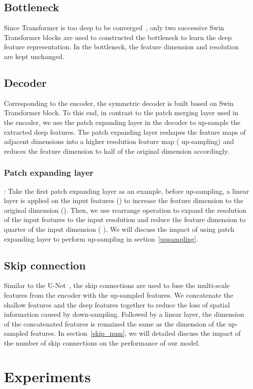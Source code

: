 \documentclass[runningheads]{llncs}
\begin{document}
\subsection{Bottleneck}
Since Transformer is too deep to be converged~\cite{deeper}, only two successive Swin Transformer blocks are used to constructed the bottleneck to learn the deep feature representation. In the bottleneck, the feature dimension and resolution are kept unchanged.

\subsection{Decoder}

Corresponding to the encoder, the symmetric decoder is built based on Swin Transformer block. To this end, in contrast to the patch merging layer used in the encoder, we use the patch expanding layer in the decoder to up-sample the extracted deep features. The patch expanding layer reshapes the feature maps of adjacent dimensions into a higher resolution feature map ( up-sampling) and reduces the feature dimension to half of the original dimension accordingly. 

\subsubsection{Patch expanding layer}:
Take the first patch expanding layer as an example, before up-sampling, a linear layer is applied on the input features () to increase the feature dimension to  the original dimension (). Then, we use rearrange operation to expand the resolution of the input features to  the input resolution and reduce the feature dimension to quarter of the input dimension (  ). We will discuss the impact of using patch expanding layer to perform up-sampling in section~\ref{upsampling}.

\subsection{Skip connection}
Similar to the U-Net~\cite{unet}, the skip connections are used to fuse the multi-scale features from the encoder with the up-sampled features. We concatenate the shallow features and the deep features together to reduce the loss of spatial information caused by down-sampling. Followed by a linear layer, the dimension of the concatenated features is remained the same as the dimension of the up-sampled features. In section~\ref{skip_num}, we will detailed discuss the impact of the number of skip connections on the performance of our model. \section{Experiments}
\end{document}
